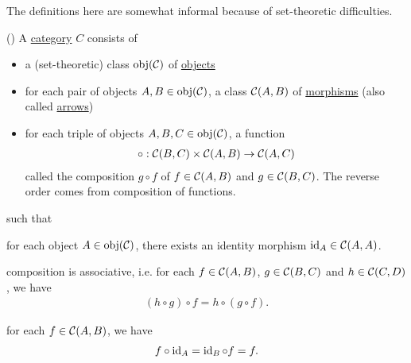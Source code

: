 \begin{note}
  The definitions here are somewhat informal because of set-theoretic difficulties.
\end{note}

\begin{definition}\label{def:category}(\cite[definition 1.1.1]{Leinster2014})
  A \uline{category} $C$ consists of
  \begin{itemize}
    \item a (set-theoretic) class $\operatorname{obj}(\mathcal C)$ of \uline{objects}
    \item for each pair of objects $A, B \in \operatorname{obj}(\mathcal C)$, a class ${\mathcal C}(A, B)$ of \uline{morphisms} (also called \uline{arrows})
    \item for each triple of objects $A, B, C \in \operatorname{obj}(\mathcal C)$, a function
    \begin{align*}
      \circ: {\mathcal C}(B, C) \times {\mathcal C}(A, B) \to {\mathcal C}(A, C)
    \end{align*}
    called the composition $g \circ f$ of $f \in {\mathcal C}(A, B)$ and $g \in {\mathcal C}(B, C)$. The reverse order comes from composition of functions.
  \end{itemize}
  such that
  \begin{defenum}
    \item for each object $A \in \operatorname{obj}(\mathcal C)$, there exists an identity morphism $\operatorname{id}_A \in {\mathcal C}(A, A)$.
    \item composition is associative, i.e. for each $f \in {\mathcal C}(A, B)$, $g \in {\mathcal C}(B, C)$ and $h \in {\mathcal C}(C, D)$, we have
    \begin{align*}
      (h \circ g) \circ f = h \circ (g \circ f).
    \end{align*}
    \item for each $f \in {\mathcal C}(A, B)$, we have
    \begin{align*}
      f \circ \operatorname{id}_A = \operatorname{id}_B \circ f = f.
    \end{align*}
  \end{defenum}
\end{definition}

